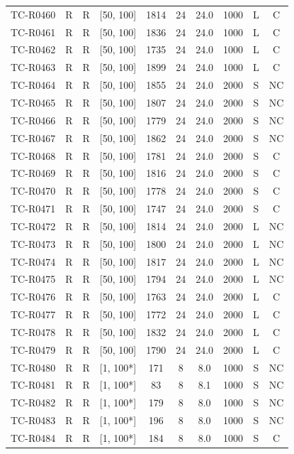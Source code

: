 \begin{longtable}{lccccccccc}
TC-R0460 & R & R & [50, 100] & 1814 & 24 & 24.0 & 1000 & L & C \\
TC-R0461 & R & R & [50, 100] & 1836 & 24 & 24.0 & 1000 & L & C \\
TC-R0462 & R & R & [50, 100] & 1735 & 24 & 24.0 & 1000 & L & C \\
TC-R0463 & R & R & [50, 100] & 1899 & 24 & 24.0 & 1000 & L & C \\
TC-R0464 & R & R & [50, 100] & 1855 & 24 & 24.0 & 2000 & S & NC \\
TC-R0465 & R & R & [50, 100] & 1807 & 24 & 24.0 & 2000 & S & NC \\
TC-R0466 & R & R & [50, 100] & 1779 & 24 & 24.0 & 2000 & S & NC \\
TC-R0467 & R & R & [50, 100] & 1862 & 24 & 24.0 & 2000 & S & NC \\
TC-R0468 & R & R & [50, 100] & 1781 & 24 & 24.0 & 2000 & S & C \\
TC-R0469 & R & R & [50, 100] & 1816 & 24 & 24.0 & 2000 & S & C \\
TC-R0470 & R & R & [50, 100] & 1778 & 24 & 24.0 & 2000 & S & C \\
TC-R0471 & R & R & [50, 100] & 1747 & 24 & 24.0 & 2000 & S & C \\
TC-R0472 & R & R & [50, 100] & 1814 & 24 & 24.0 & 2000 & L & NC \\
TC-R0473 & R & R & [50, 100] & 1800 & 24 & 24.0 & 2000 & L & NC \\
TC-R0474 & R & R & [50, 100] & 1817 & 24 & 24.0 & 2000 & L & NC \\
TC-R0475 & R & R & [50, 100] & 1794 & 24 & 24.0 & 2000 & L & NC \\
TC-R0476 & R & R & [50, 100] & 1763 & 24 & 24.0 & 2000 & L & C \\
TC-R0477 & R & R & [50, 100] & 1772 & 24 & 24.0 & 2000 & L & C \\
TC-R0478 & R & R & [50, 100] & 1832 & 24 & 24.0 & 2000 & L & C \\
TC-R0479 & R & R & [50, 100] & 1790 & 24 & 24.0 & 2000 & L & C \\
TC-R0480 & R & R & [1, 100*] & 171 & 8 & 8.0 & 1000 & S & NC \\
TC-R0481 & R & R & [1, 100*] & 83 & 8 & 8.1 & 1000 & S & NC \\
TC-R0482 & R & R & [1, 100*] & 179 & 8 & 8.0 & 1000 & S & NC \\
TC-R0483 & R & R & [1, 100*] & 196 & 8 & 8.0 & 1000 & S & NC \\
TC-R0484 & R & R & [1, 100*] & 184 & 8 & 8.0 & 1000 & S & C \\

\end{longtable}
